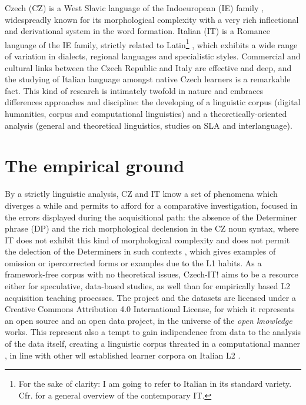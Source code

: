 \documentclass[a4paper,twoside,11pt,chapterprefix=false,bibliography=totocnumbered]{scrbook}
\theoremstyle{definition}
\theoremstyle{definition}
\theoremstyle{definition}
\theoremstyle{remark}
\begin{document}
Czech (CZ) is a West Slavic language of the Indoeuropean (IE) family
\citep[\citet{glottolog}]{beekes_comparative_2011}, widespreadly known
for its morphological complexity with a very rich inflectional and
derivational system in the word formation. Italian (IT) is a Romance
language of the IE family, strictly related to Latin\footnote{For the
  sake of clarity: I am going to refer to Italian in its standard
  variety. Cfr.
  \citep[\citet{d_achille-italiano}]{berruto2012sociolinguistica} for a
  general overview of the contemporary IT.} , which exhibits a wide
range of variation in dialects, regional languages and specialistic
styles. Commercial and cultural links between the Czech Republic and
Italy are effective and deep, and the studying of Italian language
amongst native Czech learners is a remarkable fact. This kind of
research is intimately twofold in nature and embraces differences
approaches and discipline: the developing of a linguistic corpus
(digital humanities, corpus and computational linguistics) and a
theoretically-oriented analysis (general and theoretical linguistics,
studies on SLA and interlanguage).

\section{The empirical ground}\label{the-empirical-ground}

By a strictly linguistic analysis, CZ and IT know a set of phenomena
which diverges a while and permits to afford for a comparative
investigation, focused in the errors displayed during the acquisitional
path: the absence of the Determiner phrase (DP) and the rich
morphological declension in the CZ noun syntax, where IT does not
exhibit this kind of morphological complexity and does not permit the
delection of the Determiners in such contexts
\citep[\citet{longobardi-n_movement}]{bianchi-1992}, which gives
examples of omission or ipercorrected forms or examples due to the L1
habits. As a framework-free corpus with no theoretical issues, Czech-IT!
aims to be a resource either for speculative, data-based studies, as
well than for empirically based L2 acquisition teaching processes. The
project and the datasets are licensed under a Creative Commons
Attribution 4.0 International License, for which it represents an open
source and an open data project, in the universe of the \emph{open
knowledge} works. This represent also a tempt to gain indipendence from
data to the analysis of the data itself, creating a linguistic corpus
threated in a computational manner
\citep[\citet{kuebler-corpus_linguistics}, \citet{schmid-treetagger},
\citet{bird-nltk}, \citet{kurdi_natural_2016-2},
\citet{clark_handbook_2010-1}]{abney1997}, in line with other wll
established learner corpora on Italian L2 \citep[\citet{lips}]{valico}.
\end{document}
